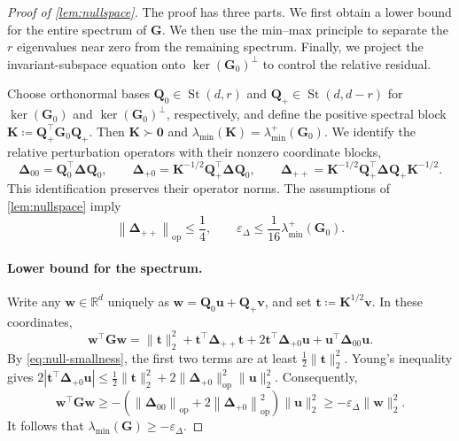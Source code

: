 \documentclass[10pt,a4paper]{amsart}
\newcommand{\R}{\mathbb{R}}
\DeclareMathOperator{\St}{St}
\newcommand{\bze}{\bm{0}}
\newcommand{\opn}[1]{\left\lVert #1\right\rVert_{\mathrm{op}}}
\newcommand{\trans}{\top}
\begin{document}
\begin{proof}[Proof of \cref{lem:nullspace}]
The proof has three parts.  We first obtain a lower bound for the entire
spectrum of $\bm G$.  We then use the min--max principle to separate the
$r$ eigenvalues near zero from the remaining spectrum.  Finally, we project
the invariant-subspace equation onto $\ker(\bm G_0)^\perp$ to control the
relative residual.


Choose orthonormal bases
$\bm Q_0\in\St(d,r)$ and
$\bm Q_+\in\St(d,d-r)$
for $\ker(\bm G_0)$ and $\ker(\bm G_0)^\perp$, respectively, and define the
positive spectral block
$\bm K\coloneqq\bm Q_+^\trans\bm G_0\bm Q_+$.
Then $\bm K\succ\bze$ and
$\lambda_{\min}(\bm K)=\lambda_{\min}^{+}(\bm G_0)$.
We identify the relative perturbation operators with their nonzero coordinate
blocks,
\[
  \bm\Delta_{00}
  =
  \bm Q_0^\trans\bm\Delta\bm Q_0,
  \qquad
  \bm\Delta_{+0}
  =
  \bm K^{-1/2}\bm Q_+^\trans\bm\Delta\bm Q_0,
  \qquad
  \bm\Delta_{++}
  =
  \bm K^{-1/2}
  \bm Q_+^\trans\bm\Delta\bm Q_+
  \bm K^{-1/2}.
\]
This identification preserves their operator norms.  The assumptions of
\cref{lem:nullspace} imply
\begin{equation}
\label{eq:null-smallness}
  \opn{\bm\Delta_{++}}\le\frac14,
  \qquad
  \varepsilon_\Delta
  \le\frac{1}{16}\lambda_{\min}^{+}(\bm G_0).
\end{equation}

\paragraph{Lower bound for the spectrum.}
Write any $\bm w\in\R^d$ uniquely as
$\bm w=\bm Q_0\bm u+\bm Q_+\bm v$, and set
$\bm t\coloneqq\bm K^{1/2}\bm v$.  In these coordinates,
\begin{equation}
\label{eq:null-quadratic-form}
  \bm w^\trans\bm G\bm w
  =
  \|\bm t\|_2^2
  +
  \bm t^\trans\bm\Delta_{++}\bm t
  +
  2\bm t^\trans\bm\Delta_{+0}\bm u
  +
  \bm u^\trans\bm\Delta_{00}\bm u.
\end{equation}
By \cref{eq:null-smallness}, the first two terms are at least
$\frac12\|\bm t\|_2^2$.  Young's inequality gives
$2|\bm t^\trans\bm\Delta_{+0}\bm u|
\le\frac12\|\bm t\|_2^2+
2\|\bm\Delta_{+0}\|_{\mathrm{op}}^2\|\bm u\|_2^2$.
Consequently,
\[
  \bm w^\trans\bm G\bm w
  \ge
  -\left(
    \opn{\bm\Delta_{00}}
    +
    2\opn{\bm\Delta_{+0}}^2
  \right)
  \|\bm u\|_2^2
  \ge
  -\varepsilon_\Delta\|\bm w\|_2^2.
\]
It follows that $\lambda_{\min}(\bm G)\ge-\varepsilon_\Delta$.


\end{proof}
\end{document}
